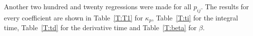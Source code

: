 Another two hundred and twenty regressions were made for all $p_{ij}$. The results for every coefficient are shown in Table~\ref{T:T1} for $\kappa_p$, Table~\ref{T:ti} for the integral time, Table~\ref{T:td} for the derivative time and Table~\ref{T:beta} for $\beta$.

